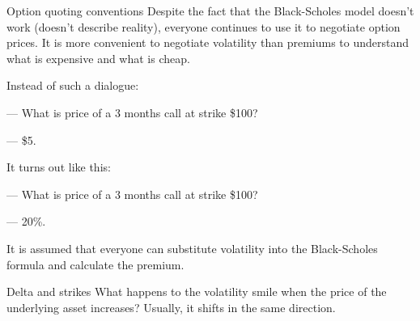 \documentclass{beamer}
\begin{document}
\begin{frame}{Option quoting conventions}
\justify
Despite the fact that the Black-Scholes model doesn't work (doesn't describe reality), everyone continues to use it to negotiate option prices. It is more convenient to negotiate volatility than premiums to understand what is expensive and what is cheap.

\justify
Instead of such a dialogue:

--- What is price of a 3 months call at strike \$100?

--- \$5.

\justify
It turns out like this:

--- What is price of a 3 months call at strike \$100?

--- 20\%.

\justify
It is assumed that everyone can substitute volatility into the Black-Scholes formula and calculate the premium.
\end{frame}



\begin{frame}{Delta and strikes}
\justify
What happens to the volatility smile when the price of the underlying asset increases? Usually, it shifts in the same direction.

\centering
{}
\end{frame}
\end{document}

